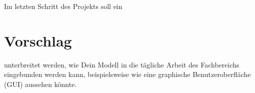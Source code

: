 Im letzten Schritt des Projekts soll ein \section{Vorschlag} unterbreitet werden, wie Dein Modell in die tägliche Arbeit des Fachbereichs eingebunden werden kann, beispielsweise wie eine graphische Benutzeroberfläche (GUI) aussehen könnte. 

